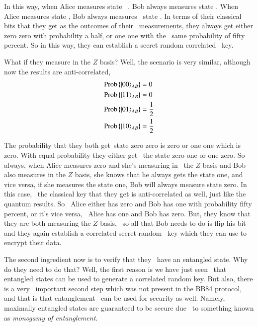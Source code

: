 In this way, when Alice measures state 
\ket{+}, Bob always measures state \ket{+}. When
Alice measures state \ket{-}, Bob always measures 
state \ket{-}. In terms of their classical bits
that they get as the outcomes of their 
measurements, they always get either zero
zero with probability a half, or one one with the 
same probability of fifty percent. So in this way,
they can establish a secret random correlated 
key.

What if they measure in the $Z$ basis? Well,
the scenario is very similar, although 
now the results are anti-correlated,
\begin{align}
\begin{aligned}
\operatorname{Prob}\left\{\left| 00 \right\rangle_{A B}\right\} &= 0 \\ 
\operatorname{Prob}\left\{\left| 11 \right\rangle_{A B}\right\} &= 0 \\
\operatorname{Prob}\left\{\left| 01 \right\rangle_{A B}\right\} &= \frac{1}{2} \\ 
\operatorname{Prob}\left\{\left| 10 \right\rangle_{A B}\right\} &= \frac{1}{2}
\end{aligned}
\end{align}

The probability that they both get state zero zero
is zero or one one which is zero.
With equal probability they either get 
the state zero one or one zero. So always,
when Alice measures zero and she's measuring in 
the $Z$ basis and Bob also measures in the $Z$ basis,
she knows that he always gets the state one, and 
vice versa, if she measures the state one, Bob
will always measure state zero. In this case, 
the classical key that they get is anti-correlated
as well, just like the quantum results. So 
Alice either has zero and Bob has one with
probability fifty percent, or it's vice versa, 
Alice has one and Bob has zero. But, they
know that they are both measuring the $Z$ basis, 
so all that Bob needs to do is flip his bit and
they again establish a correlated secret random 
key which they can use to encrypt their data.

The second ingredient now is to verify that they 
have an entangled state. Why do they need to do
that? Well, the first reason is we have just seen 
that entangled states can be used to generate a
correlated random key. But also, there is a very 
important second step which was not present in
the BB84 protocol, and that is that entanglement 
can be used for security as well. Namely, maximally
entangled states are guaranteed to be secure due 
to something known as \emph{monogamy of entanglement}.

